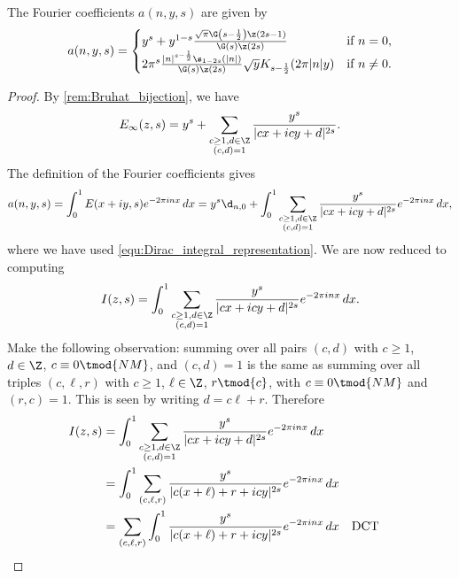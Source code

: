       \begin{proposition}\label{prop:Fourier_coefficients_of_real-analytic_Eisenstein_series}
        The Fourier coefficients $a(n,y,s)$ are given by
        \[
          a(n,y,s) = \begin{cases} y^{s}+y^{1-s}\frac{\sqrt{\pi}\G\left(s-\frac{1}{2}\right)\z(2s-1)}{\G(s)\z(2s)} & \text{if $n = 0$}, \\ 2\pi^{s}\frac{|n|^{s-\frac{1}{2}}\s_{1-2s}(|n|)}{\G(s)\z(2s)}\sqrt{y}K_{s-\frac{1}{2}}(2\pi|n|y) & \text{if $n \neq 0$}. \end{cases}
        \]
      \end{proposition}
      \begin{proof}
        By \cref{rem:Bruhat_bijection}, we have
        \[
          E_{\infty}(z,s) = y^{s}+\sum_{\substack{c \ge 1, d \in \Z \\ (c,d) = 1}}\frac{y^{s}}{|cx+icy+d|^{2s}}.
        \]
        The definition of the Fourier coefficients gives
        \begin{equation}\label{equ:real-analytic_Eisenstein_fourier_coefficient_definition}
          a(n,y,s) = \int_{0}^{1}E(x+iy,s)e^{-2\pi inx}\,dx = y^{s}\d_{n,0}+\int_{0}^{1}\sum_{\substack{c \ge 1, d \in \Z \\ (c,d) = 1}}\frac{y^{s}}{|cx+icy+d|^{2s}}e^{-2\pi inx}\,dx,
        \end{equation}
        where we have used \cref{equ:Dirac_integral_representation}. We are now reduced to computing
        \[
          I(z,s) = \int_{0}^{1}\sum_{\substack{c \ge 1, d \in \Z \\ (c,d) = 1}}\frac{y^{s}}{|cx+icy+d|^{2s}}e^{-2\pi inx}\,dx.
        \]
        Make the following observation: summing over all pairs $(c,d)$ with $c \ge 1$, $d \in \Z$, $c \equiv 0 \tmod{NM}$, and $(c,d) = 1$ is the same as summing over all triples $(c,\ell,r)$ with $c \ge 1$, $\ell \in \Z$, $r \tmod{c}$, with $c \equiv 0 \tmod{NM}$ and $(r,c) = 1$. This is seen by writing $d = c\ell+r$. Therefore
        \begin{align*}
          I(z,s) &= \int_{0}^{1}\sum_{\substack{c \ge 1, d \in \Z \\ (c,d) = 1}}\frac{y^{s}}{|cx+icy+d|^{2s}}e^{-2\pi inx}\,dx \\
          &= \int_{0}^{1}\sum_{(c,\ell,r)}\frac{y^{s}}{|c(x+\ell)+r+icy|^{2s}}e^{-2\pi inx}\,dx \\
          &= \sum_{(c,\ell,r)}\int_{0}^{1}\frac{y^{s}}{|c(x+\ell)+r+icy|^{2s}}e^{-2\pi inx}\,dx &&\text{DCT} \\

\end{align*}
\end{proof}
